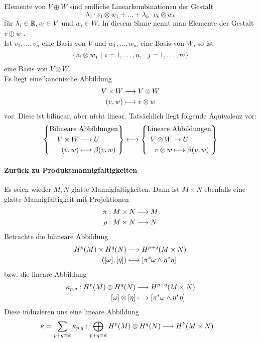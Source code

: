 Elemente von $V\oplus W$ sind endliche Linearkombinationen der Gestalt
\[ \lambda_1 \cdot v_1 \otimes w_1 + \ldots + \lambda_k\cdot v_k \otimes w_k \]
für $\lambda_i \in \mathbb{R}, v_i \in V$ und $w_i \in W$. In diesem Sinne nennt man Elemente der Gestalt $v\oplus w$ .\\
Ist $v_1, \ldots, v_n$ eine Basis von $V$ und $w_1, \ldots, w_m$ eine Basis von $W$, so ist
\[ \set{v_i \otimes w_j}{i = 1, \ldots, n,~~j=1, \ldots, m} \]
eine Basis von $V\otimes W$.\\
Es liegt eine kanonische Abbildung
\begin{align*}
V\times W & \overset{}{\longrightarrow} V\otimes W\\
(v,w) & \longmapsto v\otimes w
\end{align*}
vor. Diese ist bilinear, aber nicht linear. Tatsächlich liegt folgende Äquivalenz vor:
\begin{align*}
\left\lbrace
\begin{aligned}
\text{Bilineare }&\text{Abbildungen}\\
V\times W &\overset{}{\longrightarrow} U\\
(v,w) & \longmapsto \beta(v,w)
\end{aligned}
\right\rbrace
\longleftrightarrow
\left\lbrace
\begin{aligned}
\text{Lineare }&\text{Abbildungen}\\
V\otimes W &\overset{}{\rightarrow} U\\
v\otimes w & \longmapsto \beta(v,w)
\end{aligned}
\right\rbrace
\end{align*}

\paragraph{Zurück zu Produktmannigfaltigkeiten\\}
Es seien wieder $M,N$ glatte Mannigfaltigkeiten. Dann ist $M\times N$ ebenfalls eine glatte Mannigfaltigkeit mit Projektionen
\begin{align*}
\pi : M\times N & \overset{}{\longrightarrow} M\\
\rho : M\times N & \overset{}{\longrightarrow} N
\end{align*}
Betrachte die bilineare Abbildung
\begin{align*}
H^p(M) \times H^q(N) & \overset{}{\longrightarrow} H^{p+q}(M\times N)\\
([\omega],[\eta]) & \longmapsto [\pi^*\omega \wedge \eta^*\eta] 
\end{align*}
bzw. die lineare Abbildung
\begin{align*}
\kappa_{p,q} : H^p(M) \otimes H^q(N) & \overset{}{\longrightarrow} H^{p+q}(M\times N)\\
[\omega]\otimes [\eta] & \longmapsto [\pi^*\omega \wedge \eta^*\eta] 
\end{align*}
Diese induzieren uns eine lineare Abbildung
\begin{align*}
\kappa = \sum_{p+q=k}\kappa_{p,q} : \bigoplus_{p+q = k} H^p(M) \otimes H^q(N) & \overset{}{\longrightarrow} H^{k}(M\times N)
\end{align*}

